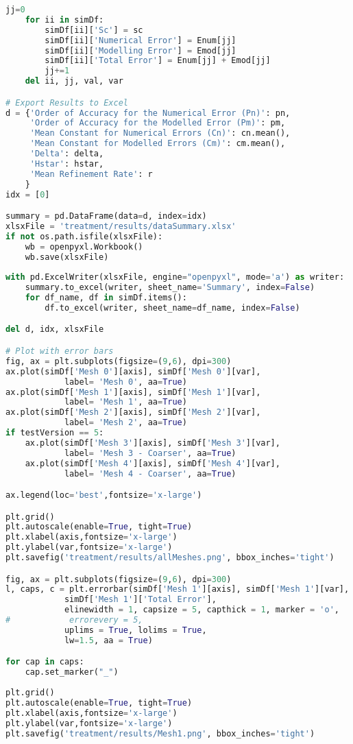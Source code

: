 \begin{lstlisting}[language=python]
    jj=0
    for ii in simDf:
        simDf[ii]['Sc'] = sc
        simDf[ii]['Numerical Error'] = Enum[jj]
        simDf[ii]['Modelling Error'] = Emod[jj]
        simDf[ii]['Total Error'] = Enum[jj] + Emod[jj]
        jj+=1
    del ii, jj, val, var

# Export Results to Excel
d = {'Order of Accuracy for the Numerical Error (Pn)': pn,
     'Order of Accuracy for the Modelled Error (Pm)': pm,
     'Mean Constant for Numerical Errors (Cn)': cn.mean(),
     'Mean Constant for Modelled Errors (Cm)': cm.mean(),
     'Delta': delta,
     'Hstar': hstar,
     'Mean Refinement Rate': r
    }
idx = [0]

summary = pd.DataFrame(data=d, index=idx)
xlsxFile = 'treatment/results/dataSummary.xlsx'
if not os.path.isfile(xlsxFile):
    wb = openpyxl.Workbook()
    wb.save(xlsxFile)
    
with pd.ExcelWriter(xlsxFile, engine="openpyxl", mode='a') as writer:
    summary.to_excel(writer, sheet_name='Summary', index=False)
    for df_name, df in simDf.items():
        df.to_excel(writer, sheet_name=df_name, index=False)

del d, idx, xlsxFile

# Plot with error bars
fig, ax = plt.subplots(figsize=(9,6), dpi=300)
ax.plot(simDf['Mesh 0'][axis], simDf['Mesh 0'][var],
            label= 'Mesh 0', aa=True)
ax.plot(simDf['Mesh 1'][axis], simDf['Mesh 1'][var],
            label= 'Mesh 1', aa=True)
ax.plot(simDf['Mesh 2'][axis], simDf['Mesh 2'][var],
            label= 'Mesh 2', aa=True)
if testVersion == 5:
    ax.plot(simDf['Mesh 3'][axis], simDf['Mesh 3'][var],
            label= 'Mesh 3 - Coarser', aa=True)
    ax.plot(simDf['Mesh 4'][axis], simDf['Mesh 4'][var],
            label= 'Mesh 4 - Coarser', aa=True)

ax.legend(loc='best',fontsize='x-large')

plt.grid()
plt.autoscale(enable=True, tight=True)
plt.xlabel(axis,fontsize='x-large')
plt.ylabel(var,fontsize='x-large')
plt.savefig('treatment/results/allMeshes.png', bbox_inches='tight')

fig, ax = plt.subplots(figsize=(9,6), dpi=300)
l, caps, c = plt.errorbar(simDf['Mesh 1'][axis], simDf['Mesh 1'][var],
            simDf['Mesh 1']['Total Error'],
            elinewidth = 1, capsize = 5, capthick = 1, marker = 'o',
#            errorevery = 5,
            uplims = True, lolims = True, 
            lw=1.5, aa = True)

for cap in caps:
    cap.set_marker("_")
    
plt.grid()
plt.autoscale(enable=True, tight=True)
plt.xlabel(axis,fontsize='x-large')
plt.ylabel(var,fontsize='x-large')
plt.savefig('treatment/results/Mesh1.png', bbox_inches='tight')

\end{lstlisting}
